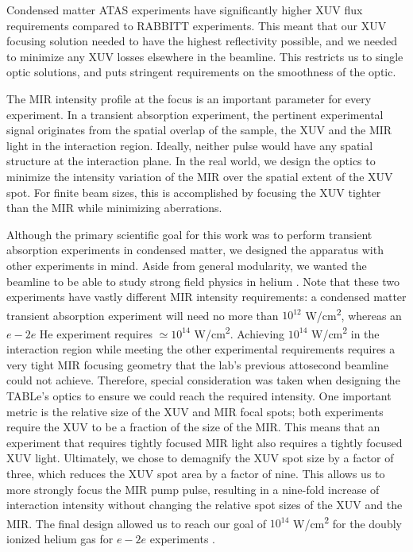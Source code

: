 Condensed matter ATAS experiments have significantly higher XUV flux requirements compared to RABBITT experiments. This meant that our XUV focusing solution needed to have the highest reflectivity possible, and we needed to minimize any XUV losses elsewhere in the beamline. This restricts us to single optic solutions, and puts stringent requirements on the smoothness of the optic.

The MIR intensity profile at the focus is an important parameter for every experiment. In a transient absorption experiment, the pertinent experimental signal originates from the spatial overlap of the sample, the XUV and the MIR light in the interaction region. Ideally, neither pulse would have any spatial structure at the interaction plane. In the real world, we design the optics to minimize the intensity variation of the MIR over the spatial extent of the XUV spot. For finite beam sizes, this is accomplished by focusing the XUV tighter than the MIR while minimizing aberrations.

Although the primary scientific goal for this work was to perform transient absorption experiments in condensed matter, we designed the apparatus with other experiments in mind. Aside from general modularity, we wanted the beamline to be able to study strong field physics in helium \cite{kiesewetterDynamicsNearThresholdAttosecond2019}. Note that these two experiments have vastly different MIR intensity requirements: a condensed matter transient absorption experiment will need no more than $10^{12}$ W/cm\textsuperscript{2}, whereas an $e-2e$ He experiment requires $\simeq 10^{14}$ W/cm\textsuperscript{2}. Achieving $10^{14}$ W/cm\textsuperscript{2} in the interaction region while meeting the other experimental requirements requires a very tight MIR focusing geometry that the lab's previous attosecond beamline \cite{chirlaAttosecondPulseGeneration2011} could not achieve. Therefore, special consideration was taken when designing the TABLe's optics to ensure we could reach the required intensity. One important metric is the relative size of the XUV and MIR focal spots; both experiments require the XUV to be a fraction of the size of the MIR. This means that an experiment that requires tightly focused MIR light also requires a tightly focused XUV light. Ultimately, we chose to demagnify the XUV spot size by a factor of three, which reduces the XUV spot area by a factor of nine. This allows us to more strongly focus the MIR pump pulse, resulting in a nine-fold increase of interaction intensity without changing the relative spot sizes of the XUV and the MIR. The final design allowed us to reach our goal of $10^{14}$ W/cm\textsuperscript{2} for the doubly ionized helium gas for $e-2e$ experiments \cite{kiesewetterDynamicsNearThresholdAttosecond2019}.

